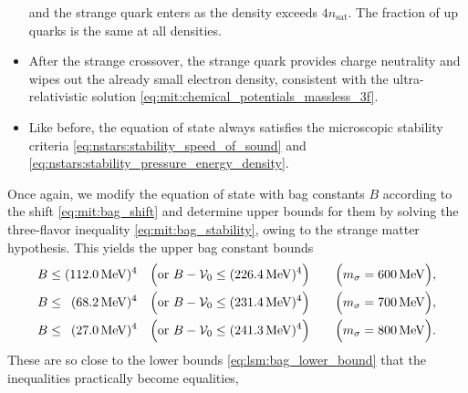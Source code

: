 \begin{itemize}
      and the strange quark enters as the density exceeds $4 n_\text{sat}$.
      The fraction of up quarks is the same at all densities.
\item After the strange crossover, the strange quark provides charge neutrality and wipes out the already small electron density,
      consistent with the ultra-relativistic solution \eqref{eq:mit:chemical_potentials_massless_3f}.
\item Like before, the equation of state always satisfies the microscopic stability criteria \eqref{eq:nstars:stability_speed_of_sound} and \eqref{eq:nstars:stability_pressure_energy_density}.
\end{itemize}

Once again, we modify the equation of state with bag constants $B$ according to the shift \eqref{eq:mit:bag_shift}
and determine upper bounds for them by solving the three-flavor inequality \eqref{eq:mit:bag_stability}, owing to the strange matter hypothesis.
This yields the upper bag constant bounds
\begin{subequations}
\begin{align}
	B \leq (\SI{112.0}{\mega\electronvolt})^4           \quad \Big(\text{or } B-\mathcal{V}_0 \leq (\SI{226.4}{\mega\electronvolt})^4\Big) \qquad \Big(m_\sigma = \SI{600}{\mega\electronvolt}\Big), \label{eq:lsm3f:bag_upper_bound_600} \\
	B \leq \phantom{0}(\SI{68.2}{\mega\electronvolt})^4 \quad \Big(\text{or } B-\mathcal{V}_0 \leq (\SI{231.4}{\mega\electronvolt})^4\Big) \qquad \Big(m_\sigma = \SI{700}{\mega\electronvolt}\Big), \label{eq:lsm3f:bag_upper_bound_700} \\
	B \leq \phantom{0}(\SI{27.0}{\mega\electronvolt})^4 \quad \Big(\text{or } B-\mathcal{V}_0 \leq (\SI{241.3}{\mega\electronvolt})^4\Big) \qquad \Big(m_\sigma = \SI{800}{\mega\electronvolt}\Big). \label{eq:lsm3f:bag_upper_bound_800}
\end{align}%
\label{eq:lsm3f:bag_upper_bound}%
\end{subequations}%
These are so close to the lower bounds \eqref{eq:lsm:bag_lower_bound} that the inequalities practically become equalities,
